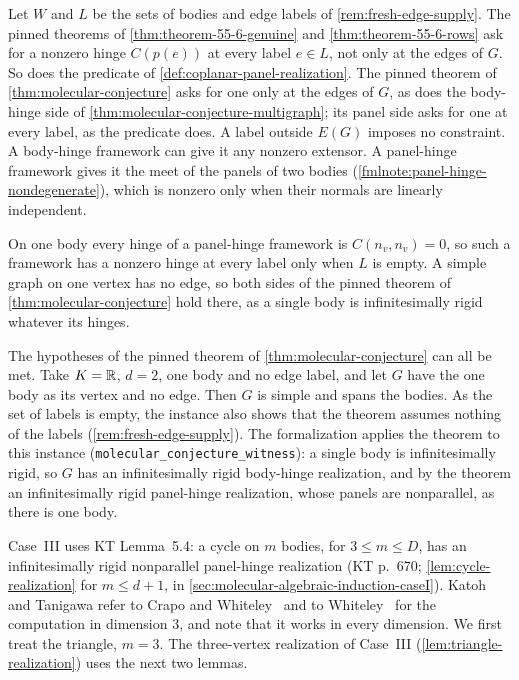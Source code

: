 \begin{remark}
  \label{rem:molecular-conjecture-essential}
  Let $W$ and $L$ be the sets of bodies and edge labels of
  \cref{rem:fresh-edge-supply}. The pinned theorems of
  \cref{thm:theorem-55-6-genuine} and \cref{thm:theorem-55-6-rows} ask for
  a nonzero hinge $C(p(e))$ at every label $e \in L$, not only at the edges
  of $G$. So does the predicate of \cref{def:coplanar-panel-realization}.
  The pinned theorem of \cref{thm:molecular-conjecture} asks for one only
  at the edges of $G$, as does the body-hinge side of
  \cref{thm:molecular-conjecture-multigraph}; its panel side asks for
  one at every label, as the predicate does. A label outside $E(G)$ imposes no constraint. A
  body-hinge framework can give it any nonzero extensor. A panel-hinge
  framework gives it the meet of the panels of two bodies
  (\cref{fmlnote:panel-hinge-nondegenerate}), which is nonzero only when
  their normals are linearly independent.

  On one body every hinge of a panel-hinge framework is $C(n_v, n_v) = 0$,
  so such a framework has a nonzero hinge at every label only when $L$ is
  empty. A simple graph on one vertex has no edge, so both sides of the
  pinned theorem of \cref{thm:molecular-conjecture} hold there, as a
  single body is infinitesimally rigid whatever its hinges.
\end{remark}

\begin{remark}
  \label{rem:molecular-conjecture-nonvacuous}
  The hypotheses of the pinned theorem of \cref{thm:molecular-conjecture}
  can all be met. Take $K = {\mathbb{R}}$, $d = 2$, one body and no edge label, and
  let $G$ have the one body as its vertex and no edge. Then $G$ is simple
  and spans the bodies. As the set of labels is empty, the instance also
  shows that the theorem assumes nothing of the labels
  (\cref{rem:fresh-edge-supply}). The formalization applies the theorem to
  this instance
  (\texttt{molecular\_\allowbreak{}conjecture\_\allowbreak{}witness}):
  a single body is infinitesimally rigid, so $G$ has an infinitesimally
  rigid body-hinge realization, and by the theorem an infinitesimally
  rigid panel-hinge realization, whose panels are nonparallel, as there is
  one body.
\end{remark}

Case~III uses KT Lemma~5.4: a cycle on $m$ bodies, for
$3 \le m \le D$, has an infinitesimally rigid nonparallel panel-hinge
realization (KT p.~670; \cref{lem:cycle-realization} for $m \le d + 1$, in
\cref{sec:molecular-algebraic-induction-caseI}). Katoh and Tanigawa refer
to Crapo and Whiteley~\cite{crapoWhiteley1982} and to
Whiteley~\cite{whiteley1999} for the computation in dimension $3$, and
note that it works in every dimension. We first treat the triangle,
$m = 3$. The three-vertex realization of Case~III
(\cref{lem:triangle-realization}) uses the next two lemmas.

